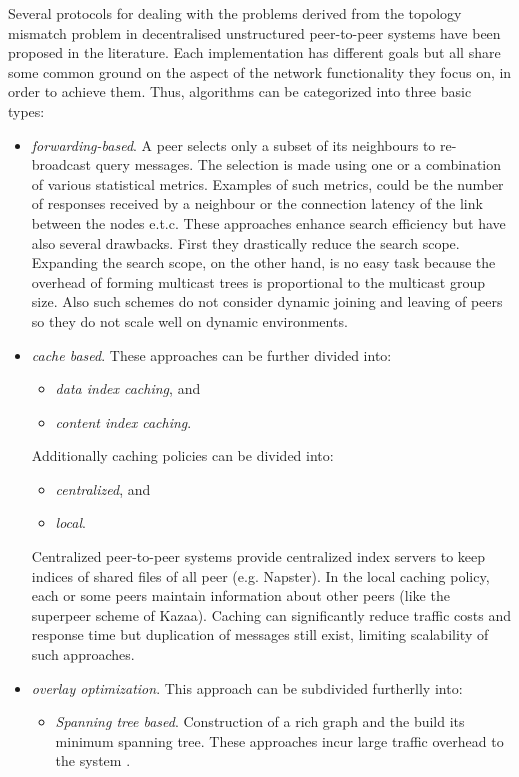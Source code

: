 \documentclass[a4paper,10pt]{article}
\begin{document}
Several protocols for dealing with the problems derived from the topology mismatch problem in decentralised unstructured peer-to-peer systems have been proposed in the literature. Each implementation has different goals but all share some common ground on the aspect of the network functionality they focus on, in order to achieve them. Thus, algorithms can be categorized into three basic types:
\begin{itemize}
  \item \emph{forwarding-based}. A peer selects only a subset of its neighbours to re-broadcast query messages. The selection is made using one or a combination of various statistical metrics. Examples of such metrics, could be the number of responses received by a neighbour or the connection latency of the link between the nodes e.t.c. These approaches enhance search efficiency but have also several drawbacks. First they drastically reduce the search scope. Expanding the search scope, on the other hand, is no easy task because the overhead of forming multicast trees is proportional to the multicast group size. Also such schemes do not consider dynamic joining and leaving of peers so they do not scale well on dynamic environments.
  \item \emph{cache based}. These approaches can be further divided into:
  \begin{itemize}
    \item \emph{data index caching}, and
    \item \emph{content index caching}.
  \end{itemize}
  Additionally caching policies can be divided into:
  \begin{itemize}
    \item \emph{centralized}, and
    \item \emph{local}.
  \end{itemize}
  Centralized peer-to-peer systems provide centralized index servers to keep indices of shared files of all peer (e.g. Napster). In the local caching policy, each or some peers maintain information about other peers (like the superpeer scheme of Kazaa). Caching can significantly reduce traffic costs and response time but duplication of messages still exist, limiting scalability of such approaches.
  \item \emph{overlay optimization}. This approach can be subdivided furtherlly into:
  \begin{itemize}
    \item \emph{Spanning tree based}. Construction of a rich graph and the build its minimum spanning tree. These approaches incur large traffic overhead to the system \cite{chu_esm_2000, chu_esm_2002}.

\end{itemize}
\end{itemize}
\end{document}
